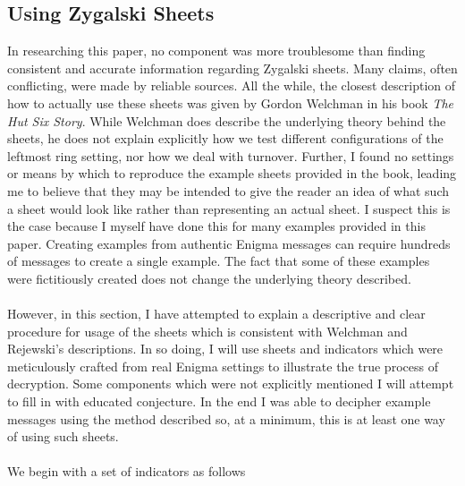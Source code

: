 \subsection{Using Zygalski Sheets}
In researching this paper, no component was more troublesome than finding consistent and accurate information regarding Zygalski sheets. Many claims, often conflicting, were made by reliable sources. All the while, the closest description of how to actually use these sheets was given by Gordon Welchman in his book \emph{The Hut Six Story}. While Welchman does describe the underlying theory behind the sheets, he does not explain explicitly how we test different configurations of the leftmost ring setting, nor how we deal with turnover. Further, I found no settings or means by which to reproduce the example sheets provided in the book, leading me to believe that they may be intended to give the reader an idea of what such a sheet would look like rather than representing an actual sheet. I suspect this is the case because I myself have done this for many examples provided in this paper. Creating examples from authentic Enigma messages can require hundreds of messages to create a single example. The fact that some of these examples were fictitiously created does not change the underlying theory described.
\\\\However, in this section, I have attempted to explain a descriptive and clear procedure for usage of the sheets which is consistent with Welchman and Rejewski's descriptions. In so doing, I will use sheets and indicators which were meticulously crafted from real Enigma settings to illustrate the true process of decryption. Some components which were not explicitly mentioned I will attempt to fill in with educated conjecture. In the end I was able to decipher example messages using the method described so, at a minimum, this is at least one way of using such sheets.
\\\\We begin with a set of indicators as follows
